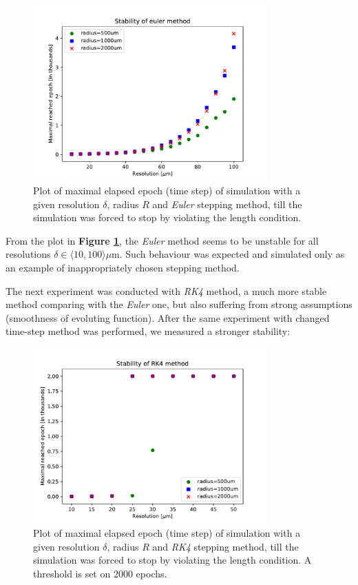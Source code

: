 \begin{figure}[h]
	\centering
	\includegraphics[width=0.8\textwidth]{graphics/results/stability-euler}
	\caption{Plot of maximal elapsed epoch (time step) of simulation with a given resolution $\delta$, radius $R$ and \textit{Euler} stepping method, till the simulation was forced to stop by violating the length condition.}
	\label{stab-euler}
\end{figure}


From the plot in \textbf{Figure \ref{stab-euler}}, the \textit{Euler} method seems to be unstable for all resolutions $\delta \in \langle 10, 100 \rangle \mu\text{m}$. Such behaviour was expected and simulated only as an example of inappropriately chosen stepping method.

The next experiment was conducted with \textit{RK4} method, a much more stable method comparing with the \textit{Euler} one, but also suffering from strong assumptions (smoothness of evoluting function). After the same experiment with changed time-step method was performed, we measured a stronger stability:

\begin{figure}[h]
	\centering
	\includegraphics[width=0.8\textwidth]{graphics/results/stability-RK4}
	\caption{Plot of maximal elapsed epoch (time step) of simulation with a given resolution $\delta$, radius $R$ and \textit{RK4} stepping method, till the simulation was forced to stop by violating the length condition. A threshold is set on $2000$ epochs.}
	\label{stab-rk4}
\end{figure}

